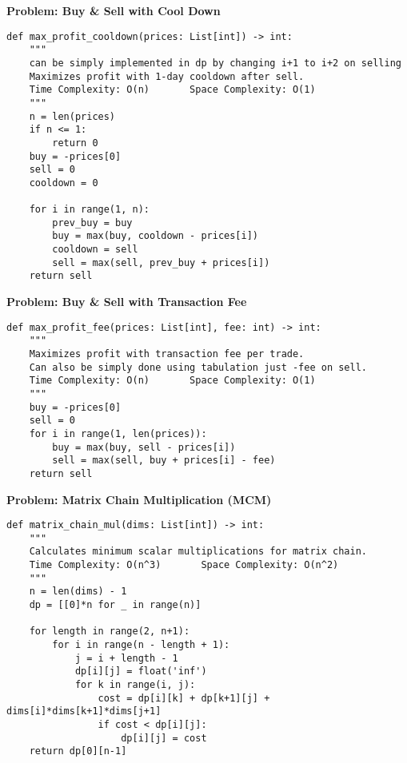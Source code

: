 \noindent\textbf{Problem: Buy \& Sell with Cool Down}
\begin{verbatim}
def max_profit_cooldown(prices: List[int]) -> int:
    """
    can be simply implemented in dp by changing i+1 to i+2 on selling
    Maximizes profit with 1-day cooldown after sell.
    Time Complexity: O(n)       Space Complexity: O(1)
    """
    n = len(prices)
    if n <= 1:
        return 0
    buy = -prices[0]
    sell = 0
    cooldown = 0
    
    for i in range(1, n):
        prev_buy = buy
        buy = max(buy, cooldown - prices[i])
        cooldown = sell
        sell = max(sell, prev_buy + prices[i])
    return sell
\end{verbatim}

\noindent\textbf{Problem: Buy \& Sell with Transaction Fee}
\begin{verbatim}
def max_profit_fee(prices: List[int], fee: int) -> int:
    """
    Maximizes profit with transaction fee per trade.
    Can also be simply done using tabulation just -fee on sell.
    Time Complexity: O(n)       Space Complexity: O(1)
    """
    buy = -prices[0]
    sell = 0
    for i in range(1, len(prices)):
        buy = max(buy, sell - prices[i])
        sell = max(sell, buy + prices[i] - fee)
    return sell
\end{verbatim}
\noindent\textbf{Problem: Matrix Chain Multiplication (MCM)}
\begin{verbatim}
def matrix_chain_mul(dims: List[int]) -> int:
    """
    Calculates minimum scalar multiplications for matrix chain.
    Time Complexity: O(n^3)       Space Complexity: O(n^2)
    """
    n = len(dims) - 1
    dp = [[0]*n for _ in range(n)]
    
    for length in range(2, n+1):
        for i in range(n - length + 1):
            j = i + length - 1
            dp[i][j] = float('inf')
            for k in range(i, j):
                cost = dp[i][k] + dp[k+1][j] + dims[i]*dims[k+1]*dims[j+1]
                if cost < dp[i][j]:
                    dp[i][j] = cost
    return dp[0][n-1]
\end{verbatim}

